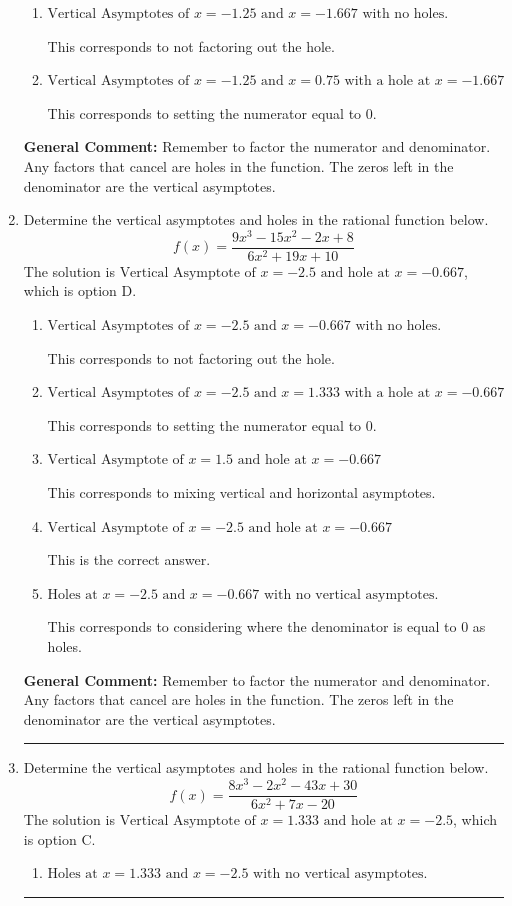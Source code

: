 \documentclass{extbook}[14pt]
\newcommand{\litem}[1]{\item #1

\rule{\textwidth}{0.4pt}}
\begin{document}
\begin{enumerate}
{\begin{enumerate}[label=\Alph*.]
This corresponds to mixing vertical and horizontal asymptotes.
\item \( \text{Vertical Asymptotes of } x = -1.25 \text{ and } x = -1.667 \text{ with no holes.} \)

This corresponds to not factoring out the hole.
\item \( \text{Vertical Asymptotes of } x = -1.25 \text{ and } x = 0.75 \text{ with a hole at } x = -1.667 \)

This corresponds to setting the numerator equal to 0.
\end{enumerate}

\textbf{General Comment:} Remember to factor the numerator and denominator. Any factors that cancel are holes in the function. The zeros left in the denominator are the vertical asymptotes.
}
\litem{
Determine the vertical asymptotes and holes in the rational function below.
\[ f(x) = \frac{9x^{3} -15 x^{2} -2 x + 8}{6x^{2} +19 x + 10} \]The solution is \( \text{Vertical Asymptote of } x = -2.5 \text{ and hole at } x = -0.667 \), which is option D.\begin{enumerate}[label=\Alph*.]
\item \( \text{Vertical Asymptotes of } x = -2.5 \text{ and } x = -0.667 \text{ with no holes.} \)

This corresponds to not factoring out the hole.
\item \( \text{Vertical Asymptotes of } x = -2.5 \text{ and } x = 1.333 \text{ with a hole at } x = -0.667 \)

This corresponds to setting the numerator equal to 0.
\item \( \text{Vertical Asymptote of } x = 1.5 \text{ and hole at } x = -0.667 \)

This corresponds to mixing vertical and horizontal asymptotes.
\item \( \text{Vertical Asymptote of } x = -2.5 \text{ and hole at } x = -0.667 \)

This is the correct answer.
\item \( \text{Holes at } x = -2.5 \text{ and } x = -0.667 \text{ with no vertical asymptotes.} \)

This corresponds to considering where the denominator is equal to 0 as holes.
\end{enumerate}

\textbf{General Comment:} Remember to factor the numerator and denominator. Any factors that cancel are holes in the function. The zeros left in the denominator are the vertical asymptotes.
}
\litem{
Determine the vertical asymptotes and holes in the rational function below.
\[ f(x) = \frac{8x^{3} -2 x^{2} -43 x + 30}{6x^{2} +7 x -20} \]The solution is \( \text{Vertical Asymptote of } x = 1.333 \text{ and hole at } x = -2.5 \), which is option C.\begin{enumerate}[label=\Alph*.]
\item \( \text{Holes at } x = 1.333 \text{ and } x = -2.5 \text{ with no vertical asymptotes.} \)


\end{enumerate}}
\end{enumerate}
\end{document}
